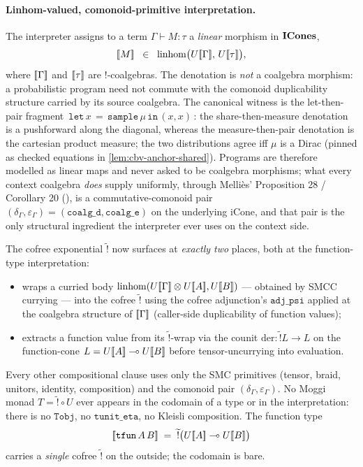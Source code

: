 \paragraph{Linhom-valued, comonoid-primitive interpretation.}
The interpreter assigns to a term
$\Gamma \vdash M : \tau$ a \emph{linear} morphism in $\mathbf{ICones}$,
\[
  [\![ M ]\!]\;\;\in\;\;
  \mathrm{linhom}\bigl(U[\![ \Gamma ]\!],\,U[\![ \tau ]\!]\bigr),
\]
where $[\![ \Gamma ]\!]$ and $[\![ \tau ]\!]$ are $\mathord{!}$-coalgebras. The
denotation is \emph{not} a coalgebra morphism: a probabilistic program
need not commute with the comonoid duplicability structure carried by
its source coalgebra. The canonical witness is the let-then-pair
fragment $\,\mathtt{let}\,x \,{=}\, \mathtt{sample}\,\mu\,\mathtt{in}\,(x, x)\,$: the
share-then-measure denotation is a pushforward along the diagonal,
whereas the measure-then-pair denotation is the cartesian product
measure; the two distributions agree iff $\mu$ is a Dirac (pinned as
checked equations in \autoref{lem:cbv-anchor-shared}). Programs are
therefore modelled as linear maps and never asked to be coalgebra
morphisms; what every context coalgebra \emph{does} supply uniformly,
through Melli\`es' Proposition 28 / Corollary 20
(), is a commutative-comonoid
pair $(\delta_\Gamma, \varepsilon_\Gamma) =
(\mathtt{coalg\_d}, \mathtt{coalg\_e})$ on the underlying iCone, and
that pair is the only structural ingredient the interpreter ever uses on
the context side.

The cofree exponential $\widetilde{\mathord{!}}$ now surfaces at
\emph{exactly two} places, both at the function-type interpretation:
\begin{itemize}
  \item {} wraps a curried body
    $\mathrm{linhom}(U[\![ \Gamma ]\!] \otimes U[\![ A ]\!], U[\![ B ]\!])$ ---
    obtained by SMCC currying --- into the cofree $\widetilde{\mathord{!}}$
    using the cofree adjunction's $\mathtt{adj\_psi}$ applied at the
    coalgebra structure of $[\![ \Gamma ]\!]$ (caller-side duplicability of
    function values);
  \item {} extracts a function value from
    its $\widetilde{\mathord{!}}$-wrap via the counit
    $\mathrm{der} : \widetilde{\mathord{!}}L \to L$ on the function-cone
    $L = U[\![ A ]\!] \multimap U[\![ B ]\!]$ before tensor-uncurrying into
    evaluation.
\end{itemize}
Every other compositional clause uses only the SMC primitives (tensor,
braid, unitors, identity, composition) and the comonoid pair
$(\delta_\Gamma, \varepsilon_\Gamma)$. No Moggi monad
$T = \widetilde{\mathord{!}} \circ U$ ever appears in the codomain of a
type or in the interpretation: there is no $\mathtt{Tobj}$, no
$\mathtt{tunit\_eta}$, no Kleisli composition. The function type
\[
  [\![ \mathtt{tfun}\,A\,B ]\!]
    \;=\;
    \widetilde{\mathord{!}}\bigl(U[\![ A ]\!] \multimap U[\![ B ]\!]\bigr)
\]
carries a \emph{single} cofree $\widetilde{\mathord{!}}$ on the outside;
the codomain is bare.

